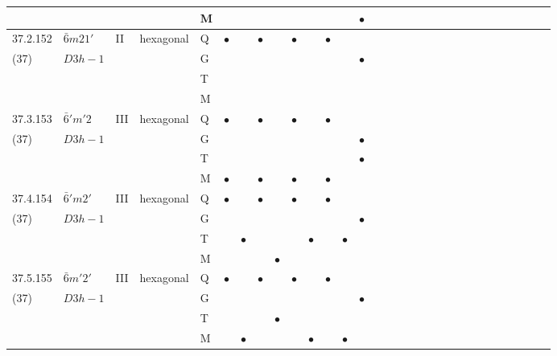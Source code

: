 \documentclass[fleqn,9pt,landscape]{jsarticle}
\begin{document}
\begin{longtable}{lllll|l|l|l|l|l|l|l|l|l|ll|ll|ll|ll|ll|ll|ll|ll}
 &  &  &  & M &  &  &  &  &  &  &  &  & $\bullet$ &  &  &  &  &  &  &  &  &  &  &  &  &  &  &  &  \\ \hline
37.2.152 & \texttt{$\bar{6}m21'$} & II & hexagonal & Q & $\bullet$ &  & $\bullet$ &  & $\bullet$ &  & $\bullet$ &  &  &  &  &  &  &  &  &  &  &  &  &  &  &  &  &  &  \\
(37) & $D3h-1$ &  &  & G &  &  &  &  &  &  &  &  & $\bullet$ &  &  &  &  &  &  &  &  &  &  &  &  &  &  &  &  \\
 &  &  &  & T &  &  &  &  &  &  &  &  &  &  &  &  &  &  &  &  &  &  &  &  &  &  &  &  &  \\
 &  &  &  & M &  &  &  &  &  &  &  &  &  &  &  &  &  &  &  &  &  &  &  &  &  &  &  &  &  \\ \hline
37.3.153 & \texttt{$\bar{6}'m'2$} & III & hexagonal & Q & $\bullet$ &  & $\bullet$ &  & $\bullet$ &  & $\bullet$ &  &  &  &  &  &  &  &  &  &  &  &  &  &  &  &  &  &  \\
(37) & $D3h-1$ &  &  & G &  &  &  &  &  &  &  &  & $\bullet$ &  &  &  &  &  &  &  &  &  &  &  &  &  &  &  &  \\
 &  &  &  & T &  &  &  &  &  &  &  &  & $\bullet$ &  &  &  &  &  &  &  &  &  &  &  &  &  &  &  &  \\
 &  &  &  & M & $\bullet$ &  & $\bullet$ &  & $\bullet$ &  & $\bullet$ &  &  &  &  &  &  &  &  &  &  &  &  &  &  &  &  &  &  \\ \hline
37.4.154 & \texttt{$\bar{6}'m2'$} & III & hexagonal & Q & $\bullet$ &  & $\bullet$ &  & $\bullet$ &  & $\bullet$ &  &  &  &  &  &  &  &  &  &  &  &  &  &  &  &  &  &  \\
(37) & $D3h-1$ &  &  & G &  &  &  &  &  &  &  &  & $\bullet$ &  &  &  &  &  &  &  &  &  &  &  &  &  &  &  &  \\
 &  &  &  & T &  & $\bullet$ &  &  &  & $\bullet$ &  & $\bullet$ &  &  &  &  &  &  &  &  &  &  &  &  &  &  &  &  &  \\
 &  &  &  & M &  &  &  & $\bullet$ &  &  &  &  &  &  &  &  &  &  &  &  &  &  &  &  &  &  &  &  &  \\ \hline
37.5.155 & \texttt{$\bar{6}m'2'$} & III & hexagonal & Q & $\bullet$ &  & $\bullet$ &  & $\bullet$ &  & $\bullet$ &  &  &  &  &  &  &  &  &  &  &  &  &  &  &  &  &  &  \\
(37) & $D3h-1$ &  &  & G &  &  &  &  &  &  &  &  & $\bullet$ &  &  &  &  &  &  &  &  &  &  &  &  &  &  &  &  \\
 &  &  &  & T &  &  &  & $\bullet$ &  &  &  &  &  &  &  &  &  &  &  &  &  &  &  &  &  &  &  &  &  \\
 &  &  &  & M &  & $\bullet$ &  &  &  & $\bullet$ &  & $\bullet$ &  &  &  &  &  &  &  &  &  &  &  &  &  &  &  &  &  \\
\end{longtable}
\end{document}
